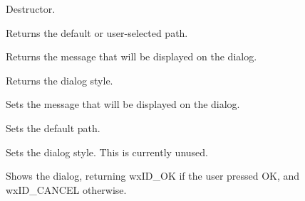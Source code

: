 



\label{wxdirdialogdtor}


Destructor.

\label{wxdirdialoggetpath}


Returns the default or user-selected path.

\label{wxdirdialoggetmessage}


Returns the message that will be displayed on the dialog.

\label{wxdirdialoggetstyle}


Returns the dialog style.

\label{wxdirdialogsetmessage}


Sets the message that will be displayed on the dialog.

\label{wxdirdialogsetpath}


Sets the default path.

\label{wxdirdialogsetstyle}


Sets the dialog style. This is currently unused.

\label{wxdirdialogshowmodal}


Shows the dialog, returning wxID\_OK if the user pressed OK, and wxID\_CANCEL
otherwise.


